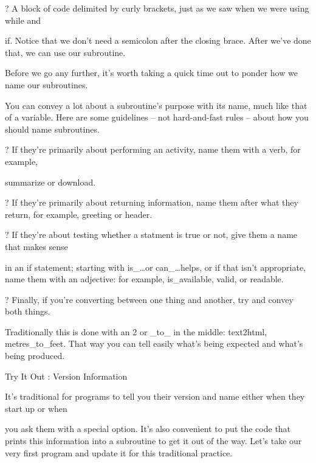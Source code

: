 \documentclass[a4paper,11pt]{book}
\begin{document}
\noindent 

\noindent ? A block of code delimited by curly brackets, just as we saw when we were using while and

if. Notice that we don't need a semicolon after the closing brace. After we've done that, we can use our subroutine.

\noindent Before we go any further, it's worth taking a quick time out to ponder how we name our subroutines.

\noindent You can convey a lot about a subroutine's purpose with its name, much like that of a variable. Here are some guidelines -- not hard-and-fast rules -- about how you should name subroutines.

\noindent 

\noindent ? If they're primarily about performing an activity, name them with a verb, for example,

\noindent summarize or download.

\noindent 

\noindent ? If they're primarily about returning information, name them after what they return, for example, greeting or header.

\noindent 

\noindent ? If they're about testing whether a statment is true or not, give them a name that makes sense

\noindent in an if statement; starting with is\_\dots  or can\_\dots  helps, or if that isn't appropriate, name them with an adjective: for example, is\_available, valid, or readable.

\noindent 

\noindent ? Finally, if you're converting between one thing and another, try and convey both things.

\noindent Traditionally this is done with an 2 or \_to\_ in the middle: text2html, metres\_to\_feet. That way you can tell easily what's being expected and what's being produced.

\noindent 

\noindent 

\noindent Try It Out : Version Information

\noindent 

\noindent It's traditional for programs to  tell  you  their  version  and  name  either  when  they  start  up  or  when

\noindent you  ask them with  a special option.  It's  also  convenient  to  put the  code  that  prints  this  information into  a subroutine to  get it out  of the  way.  Let's  take  our  very  first  program  and update  it  for  this traditional practice.
\end{document}
